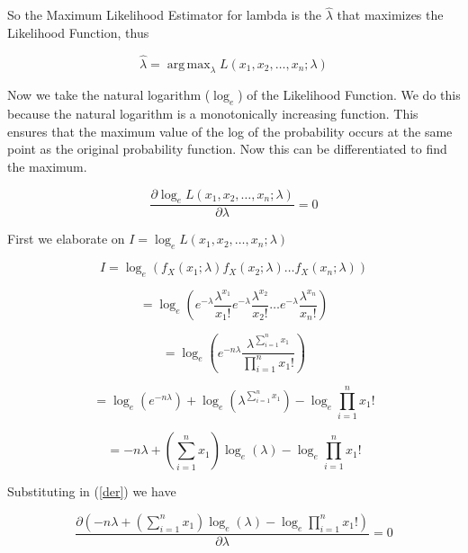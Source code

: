\documentclass{article}
\DeclareMathOperator*{\argmaxA}{arg\,max} %
\begin{document}
\noindent So the Maximum Likelihood Estimator for lambda is the $\widehat{\lambda}$ that maximizes the Likelihood Function, thus

\begin{equation}
\widehat{\lambda} = \argmaxA_\lambda L(x_1, x_2,\dots, x_n;\lambda)\nonumber
\end{equation}

\noindent Now we take the natural logarithm ($\log_e$) of the Likelihood Function. We do this because the natural logarithm is a monotonically increasing function. This ensures that the maximum value of the log of the probability occurs at the same point as the original probability function. Now this can be differentiated to find the maximum.

\begin{equation}\label{der}
\frac{\partial \log_e L(x_1, x_2,\dots, x_n;\lambda)}{\partial \lambda}=0
\end{equation}

\noindent First we elaborate on $I=\log_e L(x_1, x_2,\dots, x_n;\lambda)$

\begin{equation}
I=\log_e (f_X(x_1;\lambda)f_X(x_2;\lambda)\dots f_X(x_n;\lambda))\nonumber
\end{equation}

\begin{equation}
=\log_e (e^{-\lambda} \frac{\lambda^{x_1}}{x_1!}e^{-\lambda} \frac{\lambda^{x_2}}{x_2!}\dots e^{-\lambda} \frac{\lambda^{x_n}}{x_n!})\nonumber
\end{equation}

\begin{equation}
=\log_e (e^{-n\lambda}\frac{\lambda^{\sum_{i=1}^n x_1}}{\prod_{i=1}^n x_1!})\nonumber
\end{equation}

\begin{equation}
=\log_e(e^{-n\lambda})+\log_e(\lambda^{\sum_{i=1}^n x_1})-\log_e{\prod_{i=1}^n x_1!}\nonumber
\end{equation}

\begin{equation}
=-n\lambda+\left(\sum_{i=1}^n x_1\right)\log_e(\lambda)-\log_e{\prod_{i=1}^n x_1!}\nonumber
\end{equation}

\noindent Substituting in (\ref{der}) we have

\begin{equation}
\frac{\partial\left(-n\lambda+\left(\sum_{i=1}^n x_1\right)\log_e(\lambda)-\log_e{\prod_{i=1}^n x_1!}\right)}{\partial \lambda}=0\nonumber
\end{equation}
\end{document}
